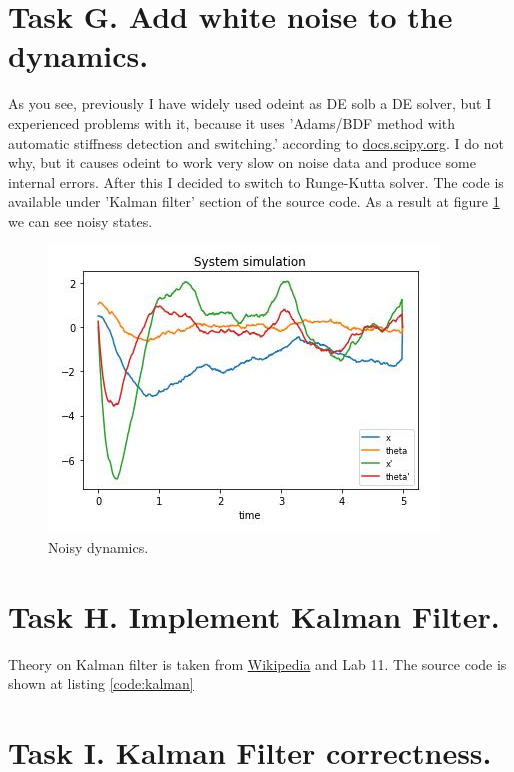 \documentclass[12pt,letterpaper]{article}
\begin{document}
\section*{Task G. Add white noise to the dynamics.}
\label{Q:G}
    As you see, previously I have widely used odeint as DE solb a DE solver, but I experienced problems with it, because it uses 'Adams/BDF method with automatic stiffness detection and switching.' according to \href{https://docs.scipy.org/doc/scipy/reference/generated/scipy.integrate.LSODA.html#scipy-integrate-lsoda}{docs.scipy.org}. I do not why, but it causes odeint to work very slow on noise data and produce some internal errors. After this I decided to switch to Runge-Kutta solver. The code is available under 'Kalman filter' section of the source code. As a result at figure \ref{fig:noise_dynamics} we can see noisy states.
    
    \begin{figure}[htb]
        \centering
        \includegraphics[width=0.5\linewidth]{images/filter/noisy_dynamics.jpg}
        \caption{Noisy dynamics.}
        \label{fig:noise_dynamics}
    \end{figure}

\section*{Task H. Implement Kalman Filter.}
\label{Q:H}
    Theory on Kalman filter is taken from \href{https://en.wikipedia.org/wiki/Kalman_filter}{Wikipedia} and Lab 11. The source code is shown at listing \ref{code:kalman}
    
    

\section*{Task I. Kalman Filter correctness.}
\label{Q:I}
    
\end{document}
